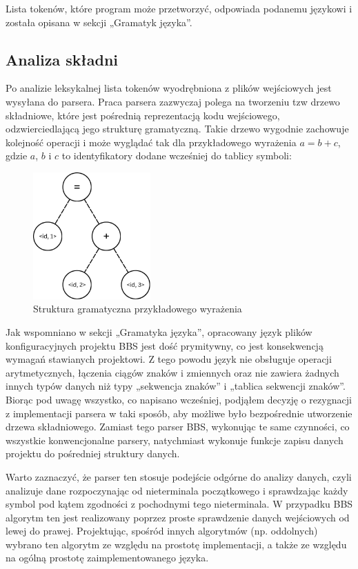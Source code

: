 Lista tokenów, które program może przetworzyć, odpowiada podanemu językowi i została opisana w sekcji „Gramatyk języka”.

\subsection{Analiza składni}

Po analizie leksykalnej lista tokenów wyodrębniona z plików wejściowych jest wysyłana do parsera. Praca parsera zazwyczaj polega na tworzeniu tzw drzewo składniowe, które jest pośrednią reprezentacją kodu wejściowego, odzwierciedlającą jego strukturę gramatyczną. Takie drzewo wygodnie zachowuje kolejność operacji i może wyglądać tak dla przykładowego wyrażenia $a = b + c$, gdzie $a$, $b$ i $c$ to identyfikatory dodane wcześniej do tablicy symboli:

\begin{figure}[h]
    \centering
    \includegraphics[width=0.4\textwidth]{Images/syntax_tree.png}
    \caption{Struktura gramatyczna przykładowego wyrażenia}
\end{figure}

Jak wspomniano w sekcji „Gramatyka języka”, opracowany język plików konfiguracyjnych projektu BBS jest dość prymitywny, co jest konsekwencją wymagań stawianych projektowi. Z tego powodu język nie obsługuje operacji arytmetycznych, łączenia ciągów znaków i zmiennych oraz nie zawiera żadnych innych typów danych niż typy „sekwencja znaków” i „tablica sekwencji znaków”. Biorąc pod uwagę wszystko, co napisano wcześniej, podjąłem decyzję o rezygnacji z implementacji parsera w taki sposób, aby możliwe było bezpośrednie utworzenie drzewa składniowego. Zamiast tego parser BBS, wykonując te same czynności, co wszystkie konwencjonalne parsery, natychmiast wykonuje funkcje zapisu danych projektu do pośredniej struktury danych.

Warto zaznaczyć, że parser ten stosuje podejście odgórne do analizy danych, czyli analizuje dane rozpoczynając od nieterminala początkowego i sprawdzając każdy symbol pod kątem zgodności z pochodnymi tego nieterminala. W przypadku BBS algorytm ten jest realizowany poprzez proste sprawdzenie danych wejściowych od lewej do prawej. Projektując, spośród innych algorytmów (np. oddolnych) wybrano ten algorytm ze względu na prostotę implementacji, a także ze względu na ogólną prostotę zaimplementowanego języka.

